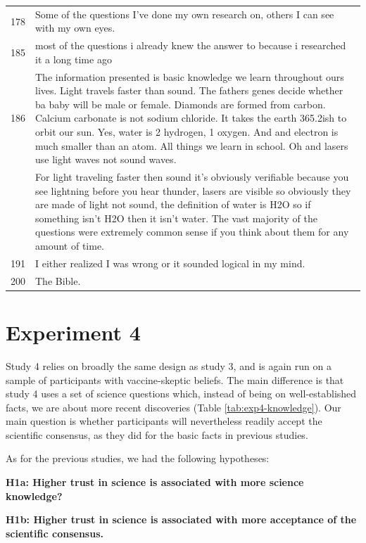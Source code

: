 \documentclass[
  doc,floatsintext]{apa6}
\begin{document}
\begin{longtable}[t]{>{}r>{\raggedright\arraybackslash}p{30em}}
178 & Some of the questions I've done my own research on, others I can see with my own eyes.\\
185 & most of the questions i already knew the answer to because i researched it a long time ago\\
186 & The information presented is basic knowledge we learn throughout ours lives. Light travels faster than sound. The fathers genes decide whether ba baby will be male or female. Diamonds are formed from carbon. Calcium carbonate is not sodium chloride. It takes the earth 365.2ish to orbit our sun. Yes, water is 2 hydrogen, 1 oxygen. And and electron is much smaller than an atom. All things we learn in school. Oh and lasers use light waves not sound waves.\\
\addlinespace
187 & For light traveling faster then sound it's obviously verifiable because you see lightning before you hear thunder, lasers are visible so obviously they are made of light not sound, the definition of water is H2O so if something isn't H2O then it isn't water.  The vast majority of the questions were extremely common sense if you think about them for any amount of time.\\
191 & I either realized I was wrong or it sounded logical in my mind.\\
200 & The Bible.\\
\bottomrule
\end{longtable}

\clearpage

\section{Experiment 4}\label{exp4}

Study 4 relies on broadly the same design as study 3, and is again run on a sample of participants with vaccine-skeptic beliefs. The main difference is that study 4 uses a set of science questions which, instead of being on well-established facts, we are about more recent discoveries (Table \ref{tab:exp4-knowledge}). Our main question is whether participants will nevertheless readily accept the scientific consensus, as they did for the basic facts in previous studies.

As for the previous studies, we had the following hypotheses:

\textbf{H1a: Higher trust in science is associated with more science knowledge?}

\textbf{H1b: Higher trust in science is associated with more acceptance of the scientific consensus.}
\end{document}
